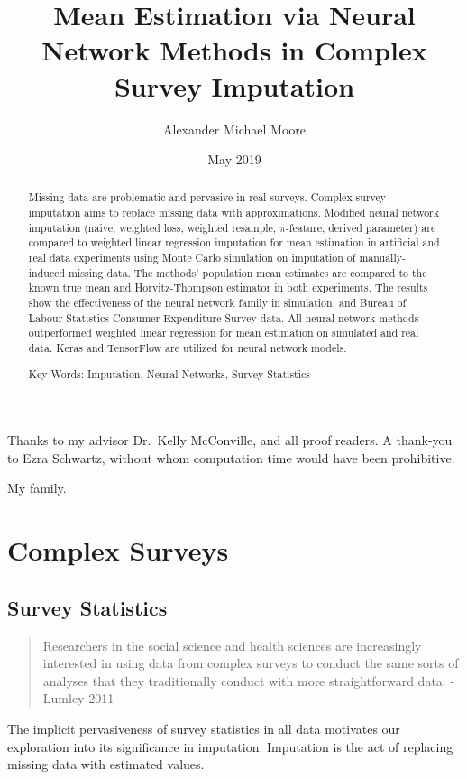 \documentclass[12pt,twoside]{reedthesis}
\title{Mean Estimation via Neural Network Methods in Complex Survey Imputation}
\author{Alexander Michael Moore}
\date{May 2019}
\begin{document}
  \maketitle

\frontmatter %
\pagestyle{empty} %
  \begin{acknowledgements}
    Thanks to my advisor Dr.~Kelly McConville, and all proof readers. A
    thank-you to Ezra Schwartz, without whom computation time would have
    been prohibitive.
  \end{acknowledgements}

  \hypersetup{linkcolor=black}
  \setcounter{tocdepth}{2}
  \tableofcontents

  \listoftables

  \listoffigures
  \begin{abstract}
    Missing data are problematic and pervasive in real surveys. Complex
    survey imputation aims to replace missing data with approximations.
    Modified neural network imputation (naive, weighted loss, weighted
    resample, \(\pi\)-feature, derived parameter) are compared to weighted
    linear regression imputation for mean estimation in artificial and real
    data experiments using Monte Carlo simulation on imputation of
    manually-induced missing data. The methods' population mean estimates
    are compared to the known true mean and Horvitz-Thompson estimator in
    both experiments. The results show the effectiveness of the neural
    network family in simulation, and Bureau of Labour Statistics Consumer
    Expenditure Survey data. All neural network methods outperformed
    weighted linear regression for mean estimation on simulated and real
    data. Keras and TensorFlow are utilized for neural network models.
    
    Key Words: Imputation, Neural Networks, Survey Statistics
  \end{abstract}
  \begin{dedication}
    My family.
  \end{dedication}
\mainmatter %
\pagestyle{fancyplain} %

\chapter{Complex Surveys}\label{complex-surveys}

\section{Survey Statistics}\label{survey-statistics}
\begin{quote}
Researchers in the social science and health sciences are increasingly
interested in using data from complex surveys to conduct the same sorts
of analyses that they traditionally conduct with more straightforward
data. - Lumley 2011
\end{quote}
The implicit pervasiveness of survey statistics in all data motivates
our exploration into its significance in imputation. Imputation is the
act of replacing missing data with estimated values.
\end{document}
